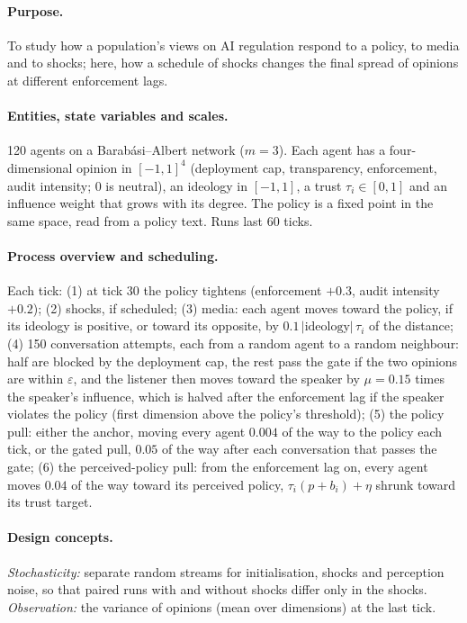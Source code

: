 \documentclass[11pt]{article}
\begin{document}
\paragraph{Purpose.} To study how a population's views on AI regulation respond to a policy, to media and to shocks; here, how a schedule of shocks changes the final spread of opinions at different enforcement lags.

\paragraph{Entities, state variables and scales.} 120 agents on a Barab\'asi--Albert network ($m=3$). Each agent has a four-dimensional opinion in $[-1,1]^4$ (deployment cap, transparency, enforcement, audit intensity; 0 is neutral), an ideology in $[-1,1]$, a trust $\tau_i \in [0,1]$ and an influence weight that grows with its degree. The policy is a fixed point in the same space, read from a policy text. Runs last 60 ticks.

\paragraph{Process overview and scheduling.} Each tick: (1) at tick 30 the policy tightens (enforcement $+0.3$, audit intensity $+0.2$); (2) shocks, if scheduled; (3) media: each agent moves toward the policy, if its ideology is positive, or toward its opposite, by $0.1\,|\text{ideology}|\,\tau_i$ of the distance; (4) 150 conversation attempts, each from a random agent to a random neighbour: half are blocked by the deployment cap, the rest pass the gate if the two opinions are within $\varepsilon$, and the listener then moves toward the speaker by $\mu = 0.15$ times the speaker's influence, which is halved after the enforcement lag if the speaker violates the policy (first dimension above the policy's threshold); (5) the policy pull: either the anchor, moving every agent $0.004$ of the way to the policy each tick, or the gated pull, $0.05$ of the way after each conversation that passes the gate; (6) the perceived-policy pull: from the enforcement lag on, every agent moves $0.04$ of the way toward its perceived policy, $\tau_i(p + b_i) + \eta$ shrunk toward its trust target.

\paragraph{Design concepts.} \emph{Stochasticity:} separate random streams for initialisation, shocks and perception noise, so that paired runs with and without shocks differ only in the shocks. \emph{Observation:} the variance of opinions (mean over dimensions) at the last tick.
\end{document}
